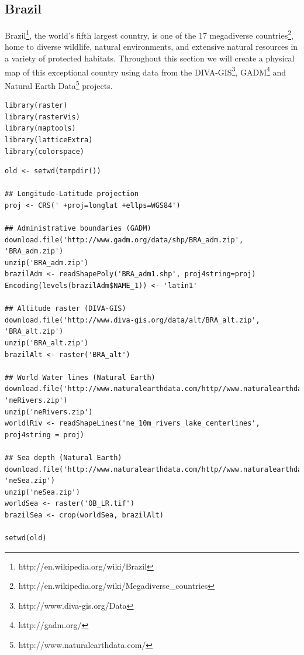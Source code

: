 \subsection{Brazil}
\label{sec-1-2}


Brazil\footnote{http://en.wikipedia.org/wiki/Brazil
 }, the world's fifth largest country, is one of the 17
megadiverse countries\footnote{http://en.wikipedia.org/wiki/Megadiverse\_{}countries
 }, home to diverse wildlife, natural
environments, and extensive natural resources in a variety of
protected habitats. Throughout this section we will create a physical
map of this exceptional country using data from the
DIVA-GIS\footnote{http://www.diva-gis.org/Data
 }, GADM\footnote{http://gadm.org/
 } and Natural Earth Data\footnote{http://www.naturalearthdata.com/
 } projects.


\lstset{language=R}
\begin{lstlisting}
library(raster)
library(rasterVis)
library(maptools)
library(latticeExtra)
library(colorspace)
\end{lstlisting}


\lstset{language=R}
\begin{lstlisting}
old <- setwd(tempdir())

## Longitude-Latitude projection
proj <- CRS(' +proj=longlat +ellps=WGS84')

## Administrative boundaries (GADM)
download.file('http://www.gadm.org/data/shp/BRA_adm.zip', 'BRA_adm.zip')
unzip('BRA_adm.zip')
brazilAdm <- readShapePoly('BRA_adm1.shp', proj4string=proj)
Encoding(levels(brazilAdm$NAME_1)) <- 'latin1'

## Altitude raster (DIVA-GIS)
download.file('http://www.diva-gis.org/data/alt/BRA_alt.zip', 'BRA_alt.zip')
unzip('BRA_alt.zip')
brazilAlt <- raster('BRA_alt')

## World Water lines (Natural Earth)
download.file('http://www.naturalearthdata.com/http//www.naturalearthdata.com/download/10m/physical/ne_10m_rivers_lake_centerlines.zip', 'neRivers.zip')
unzip('neRivers.zip')
worldlRiv <- readShapeLines('ne_10m_rivers_lake_centerlines', proj4string = proj)

## Sea depth (Natural Earth)
download.file('http://www.naturalearthdata.com/http//www.naturalearthdata.com/download/10m/raster/OB_LR.zip', 'neSea.zip')
unzip('neSea.zip')
worldSea <- raster('OB_LR.tif')
brazilSea <- crop(worldSea, brazilAlt)

setwd(old)
\end{lstlisting}


